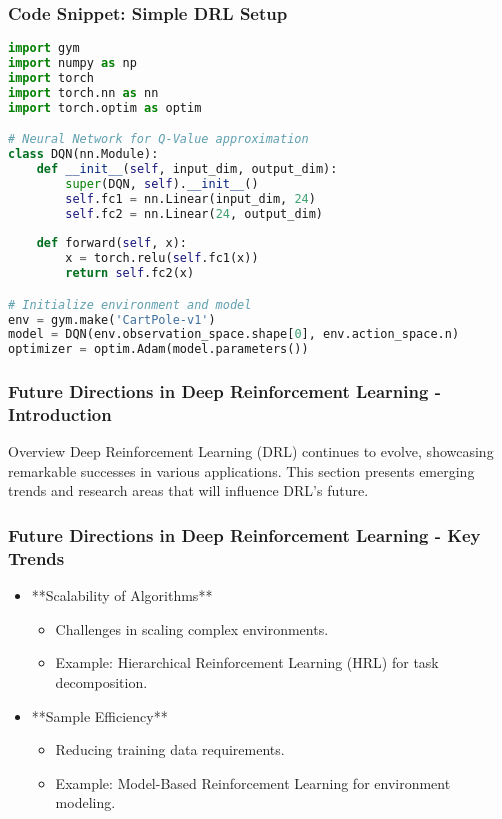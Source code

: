 \documentclass[aspectratio=169]{beamer}
\begin{document}
\begin{frame}[fragile]
    \frametitle{Code Snippet: Simple DRL Setup}
    \begin{lstlisting}[language=Python]
import gym
import numpy as np
import torch
import torch.nn as nn
import torch.optim as optim

# Neural Network for Q-Value approximation
class DQN(nn.Module):
    def __init__(self, input_dim, output_dim):
        super(DQN, self).__init__()
        self.fc1 = nn.Linear(input_dim, 24)
        self.fc2 = nn.Linear(24, output_dim)
    
    def forward(self, x):
        x = torch.relu(self.fc1(x))
        return self.fc2(x)

# Initialize environment and model
env = gym.make('CartPole-v1')
model = DQN(env.observation_space.shape[0], env.action_space.n)
optimizer = optim.Adam(model.parameters())
    \end{lstlisting}
\end{frame}

\begin{frame}[fragile]
    \frametitle{Future Directions in Deep Reinforcement Learning - Introduction}
    \begin{block}{Overview}
        Deep Reinforcement Learning (DRL) continues to evolve, showcasing remarkable successes in various applications. This section presents emerging trends and research areas that will influence DRL's future.
    \end{block}
\end{frame}

\begin{frame}[fragile]
    \frametitle{Future Directions in Deep Reinforcement Learning - Key Trends}
    \begin{itemize}
        \item **Scalability of Algorithms**
            \begin{itemize}
                \item Challenges in scaling complex environments.
                \item Example: Hierarchical Reinforcement Learning (HRL) for task decomposition.
            \end{itemize}
        \item **Sample Efficiency**
            \begin{itemize}
                \item Reducing training data requirements.
                \item Example: Model-Based Reinforcement Learning for environment modeling.
            \end{itemize}
    \end{itemize}
\end{frame}
\end{document}
